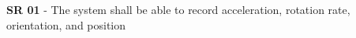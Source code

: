 \begin{landscape}


	



\textbf{SR 01} - The system shall be able to record acceleration, rotation rate, orientation, and position


\end{landscape}
